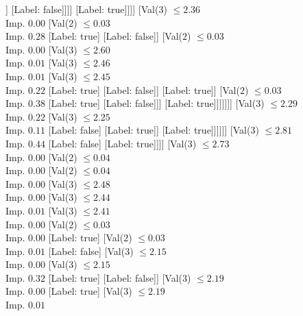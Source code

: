 \documentclass[margin=10pt]{standalone}
\begin{document}
\begin{forest}
																						]
																					[Label: false]]]]
																		[Label: true]]]]
															[Val($3$) $ \leq 2.36$ \\ Imp. $0.00$
																[Val($2$) $ \leq 0.03$ \\ Imp. $0.28$
																	[Label: true]
																	[Label: false]]
																[Val($2$) $ \leq 0.03$ \\ Imp. $0.00$
																	[Val($3$) $ \leq 2.60$ \\ Imp. $0.01$
																		[Val($3$) $ \leq 2.46$ \\ Imp. $0.01$
																			[Val($3$) $ \leq 2.45$ \\ Imp. $0.22$
																				[Label: true]
																				[Label: false]]
																			[Label: true]]
																		[Val($2$) $ \leq 0.03$ \\ Imp. $0.38$
																			[Label: true]
																			[Label: false]]]
																	[Label: true]]]]]]]
											[Val($3$) $ \leq 2.29$ \\ Imp. $0.22$
												[Val($3$) $ \leq 2.25$ \\ Imp. $0.11$
													[Label: false]
													[Label: true]]
												[Label: true]]]]]]
							[Val($3$) $ \leq 2.81$ \\ Imp. $0.44$
								[Label: false]
								[Label: true]]]]
					[Val($3$) $ \leq 2.73$ \\ Imp. $0.00$
						[Val($2$) $ \leq 0.04$ \\ Imp. $0.00$
							[Val($2$) $ \leq 0.04$ \\ Imp. $0.00$
								[Val($3$) $ \leq 2.48$ \\ Imp. $0.00$
									[Val($3$) $ \leq 2.44$ \\ Imp. $0.01$
										[Val($3$) $ \leq 2.41$ \\ Imp. $0.00$
											[Val($2$) $ \leq 0.03$ \\ Imp. $0.00$
												[Label: true]
												[Val($2$) $ \leq 0.03$ \\ Imp. $0.01$
													[Label: false]
													[Val($3$) $ \leq 2.15$ \\ Imp. $0.00$
														[Val($3$) $ \leq 2.15$ \\ Imp. $0.32$
															[Label: true]
															[Label: false]]
														[Val($3$) $ \leq 2.19$ \\ Imp. $0.00$
															[Label: true]
															[Val($3$) $ \leq 2.19$ \\ Imp. $0.01$

\end{forest}
\end{document}
